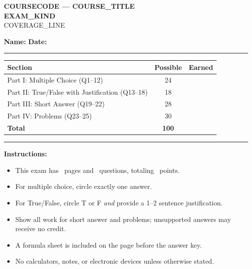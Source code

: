 \documentclass[11pt,addpoints]{exam}
\newcommand{\1}{\mathbf{1}}
\begin{document}
\begin{center}
  {\LARGE \textbf{COURSECODE — COURSE_TITLE}} \\[6pt]
  {\large \textbf{EXAM_KIND}} \\[4pt]
  {\normalsize COVERAGE_LINE}
\end{center}

\vspace{0.2cm}
\noindent\textbf{Name:} \underline{\hspace{6cm}} \hfill \textbf{Date:} \underline{\hspace{4cm}}

\vspace{0.4cm}
\noindent\rule{\textwidth}{0.4pt}

\begin{center}
\renewcommand{\arraystretch}{1.45}
\begin{tabular}{|l|c|c|}
  \hline
  \textbf{Section} & \textbf{Possible} & \textbf{Earned} \\
  \hline
  Part I: Multiple Choice (Q1--12)              & 24  & \\
  \hline
  Part II: True/False with Justification (Q13--18) & 18  & \\
  \hline
  Part III: Short Answer (Q19--22)              & 28  & \\
  \hline
  Part IV: Problems (Q23--25)                   & 30  & \\
  \hline
  \textbf{Total}                                & \textbf{100} & \\
  \hline
\end{tabular}
\end{center}

\noindent\rule{\textwidth}{0.4pt}

\vspace{0.3cm}
\noindent\textbf{Instructions:}
\begin{itemize}[nosep]
  \item This exam has \numpages\ pages and \numquestions\ questions, totaling \numpoints\ points.
  \item For multiple choice, circle exactly one answer.
  \item For True/False, circle T or F \emph{and} provide a 1--2 sentence justification.
  \item Show all work for short answer and problems; unsupported answers may receive no credit.
  \item A formula sheet is included on the page before the answer key.
  \item No calculators, notes, or electronic devices unless otherwise stated.
\end{itemize}
\end{document}
